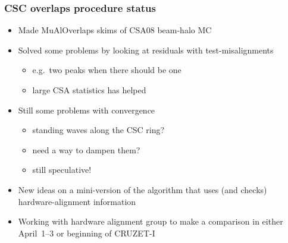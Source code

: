 \documentclass[compress]{beamer}
\begin{document}
\begin{frame}
\frametitle{CSC overlaps procedure status}

\begin{itemize}\setlength{\itemsep}{0.4 cm}
\item Made MuAlOverlaps skims of CSA08 beam-halo MC
\item Solved some problems by looking at residuals with
test-misalignments
\begin{itemize}
\item e.g.\ two peaks when there should be one
\item large CSA statistics has helped
\end{itemize}
\item Still some problems with convergence
\begin{itemize}
\item standing waves along the CSC ring?
\item need a way to dampen them?
\item still speculative!
\end{itemize}
\item New ideas on a mini-version of the algorithm that uses (and
checks) hardware-alignment information
\item Working with hardware alignment group to make a comparison in
either April~1--3 or beginning of CRUZET-I
\end{itemize}

\end{frame}
\end{document}
